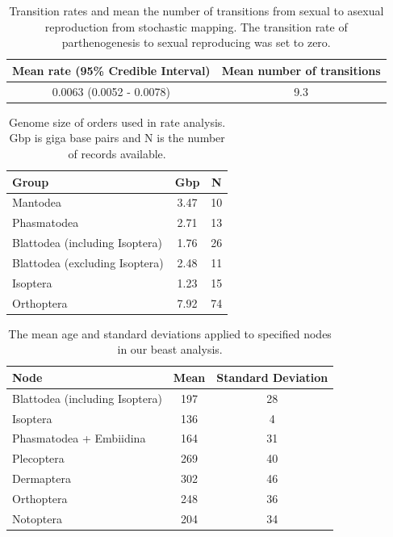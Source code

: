 \begin{table}
\centering
\begin{tabular}{ll}
\hline
\textbf{Mean rate (95\% Credible Interval)}  & \textbf{Mean number of transitions} \\ \hline
\multicolumn{1}{c}{0.0063 (0.0052 - 0.0078)} & \multicolumn{1}{c}{9.3}             \\ \hline
\end{tabular}
\caption{Transition rates and mean the number of transitions from sexual to asexual reproduction from stochastic mapping. The transition rate of parthenogenesis to sexual reproducing was set to zero.}
\label{tab:phas.simmap.summary}
\end{table}


\begin{table}
\centering
\begin{tabular}{lcc}
\hline
\textbf{Group} & \textbf{Gbp} & \textbf{N} \\ \hline
Mantodea & 3.47 & 10 \\
Phasmatodea & 2.71 & 13 \\
Blattodea (including Isoptera) & 1.76 & 26 \\
Blattodea (excluding Isoptera) & 2.48 & 11 \\
Isoptera & 1.23 & 15 \\
Orthoptera & 7.92 & 74\\ \hline
\end{tabular}
\caption{Genome size of orders used in rate analysis. Gbp is giga base pairs and N is the number of records available.}
\label{tab:genomesizes}
\end{table}

\begin{table}
\centering
\begin{tabular}{lcc}
\hline
\textbf{Node} & \textbf{Mean} & \textbf{Standard Deviation}\\ \hline
Blattodea (including Isoptera) & 197& 28 \\
Isoptera & 136& 4\\
Phasmatodea + Embiidina& 164 & 31\\
Plecoptera & 269 & 40\\
Dermaptera & 302 & 46\\
Orthoptera & 248 & 36\\
Notoptera & 204 & 34\\ \hline
\end{tabular}
\caption{The mean age and standard deviations applied to specified nodes in our beast analysis.}
\label{tab:nodeconstraints}
\end{table}